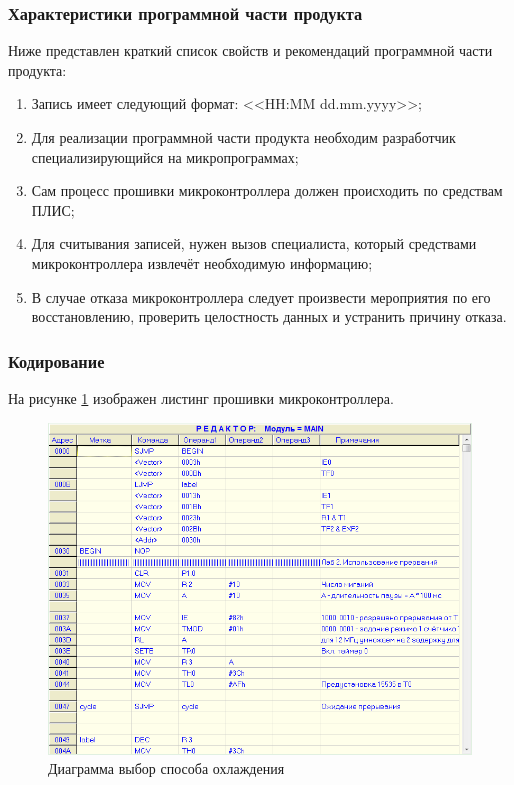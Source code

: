 				\subsubsection{Характеристики программной части продукта}
				Ниже представлен краткий список свойств и рекомендаций программной части продукта:
			\begin{enumerate}
				\changefontsizes[14pt]{14pt}
				\setlength{\itemsep}{0pt}
				\item Запись имеет следующий формат: <<HH:MM dd.mm.yyyy>>;
				\item Для реализации программной части продукта необходим разработчик специализирующийся на микропрограммах;
				\item Сам процесс прошивки микроконтроллера должен происходить по средствам ПЛИС;
				\item Для считывания записей, нужен вызов специалиста, который средствами микроконтроллера извлечёт необходимую информацию;
				\item В случае отказа микроконтроллера следует произвести мероприятия по его восстановлению, проверить целостность данных и устранить причину отказа.
			\end{enumerate}

			\subsubsection{Кодирование}
				На рисунке \ref{projectp2} изображен листинг прошивки микроконтроллера.
				\begin{figure}[ht!]
					\centering
					\includegraphics[width=150mm]{src/pictures/program.png}
					\caption{Диаграмма выбор способа охлаждения}\label{projectp2}
				\end{figure}
